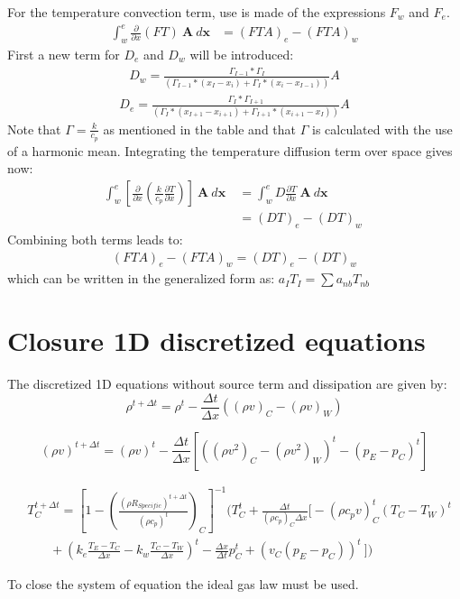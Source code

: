 For the temperature convection term, use is made of the expressions $F_w$ and $F_e$. 
\begin{align}
	\int_{w}^{e}\frac{\partial }{\partial x}\left(FT\right)\ \boldsymbol{A}\ d\boldsymbol{x}
	&= \left(FTA\right)_e - \left(FTA\right)_w
\end{align}
First a new term for $D_e$ and $D_w$ will be introduced:
\begin{align}
	D_w = \frac{\Gamma_{I-1}*\Gamma_I}{\left(\Gamma_{I-1}*\left(x_I - x_i\right)+\Gamma_{I}*\left(x_i - x_{I-1}\right)\right)} A
\end{align}
\begin{align}
	D_e = \frac{\Gamma_{I}*\Gamma_{I+1}}{\left(\Gamma_{I}*\left(x_{I+1} - x_{i+1}\right)+\Gamma_{I+1}*\left(x_{i+1} - x_{I}\right)\right)}A 
\end{align}
Note that $\Gamma = \frac{k}{c_p}$ as mentioned in the table and that $\Gamma$ is calculated with the use of a harmonic mean. 
Integrating the temperature diffusion term over space gives now:
\begin{align}
	\int_{w}^{e}\left[\frac{\partial}{\partial x}\left(\frac{k}{c_p} \frac{\partial T}{\partial x}\right)\right]\ \boldsymbol{A}\ d\boldsymbol{x}\  &= \int_{w}^{e}D\frac{\partial T}{\partial x}\ \boldsymbol{A}\ d\boldsymbol{x}\  \nonumber \\
	&= \left(DT\right)_{e}-\left(DT\right)_{w}\ 
\end{align}
Combining both terms leads to:
\begin{align}
	\left(FTA\right)_e - \left(FTA\right)_w = \left(DT\right)_{e}-\left(DT\right)_{w}
\end{align}
which can be written in the generalized form as:
$a_IT_I = \sum a_{nb}T_{nb}$

\newpage
\section{Closure 1D discretized equations}
The discretized 1D equations without source term and dissipation are given by:
\begin{equation}
	\rho^{t+\Delta t} = \rho^{t}- \frac{\Delta t}{\Delta x} \left((\rho v)_C - (\rho v)_W\right)
\end{equation}

\begin{equation}
	(\rho v)^{t+\Delta t} = (\rho v)^{t} - \frac{\Delta t}{\Delta x}\left[((\rho v^2 )_C-(\rho v^2 )_W)^t - \left(p_E-p_C\right)^t\right]
\end{equation}

\begin{align}
	&T_C^{t +\Delta t} = \left[1 - \left(\frac{(\rho R_{Specific})^{t + \Delta t}}{(\rho c_p)^{t}}\right)_C\right]^{-1} \Biggl( T_C^{t} + \frac{\Delta t}{\left(\rho c_p\right)_C \Delta x}\biggl[- \left(\rho c_p v \right)_C^{t}\left(T_C-T_W\right)^{t} \nonumber  \\
	& \ \ \ \ \ \ \ \ + \left(k_e \frac{T_E -T_C}{\Delta x}-k_w\frac{T_C - T_W}{\Delta x}\right)^{t} - \frac{\Delta x}{\Delta t}p^{t}_C + \left(v_C\left(p_E-p_C\right)\right)^{t}\  \biggr] \Biggr) 
\end{align}

To close the system of equation the ideal gas law must be used. 